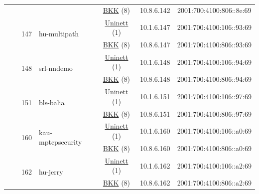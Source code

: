 \begin{small}
\begin{center}
\begin{longtable}{|c|c|c|c|c|c|c|c|}
  &  &  &  & \multicolumn{2}{|c|}{\tiny{\href{http://bkk.no}{BKK} (8)}} & \tiny{10.8.6.142} & \tiny{2001:700:4100:806::8e:69} \\* \cline{3-3}\cline{4-4}\cline{5-5}\cline{6-6}\cline{7-7}\cline{8-8}
  &  & \multirow{2}{*}{\tiny{147}} & \multicolumn{1}{|l|}{\multirow{2}{*}{\tiny{hu-multipath}}} & \multicolumn{2}{|c|}{\tiny{\href{https://www.uninett.no}{Uninett} (1)}} & \tiny{10.1.6.147} & \tiny{2001:700:4100:106::93:69} \\* \cline{5-5}\cline{6-6}\cline{7-7}\cline{8-8}
  &  &  &  & \multicolumn{2}{|c|}{\tiny{\href{http://bkk.no}{BKK} (8)}} & \tiny{10.8.6.147} & \tiny{2001:700:4100:806::93:69} \\* \cline{3-3}\cline{4-4}\cline{5-5}\cline{6-6}\cline{7-7}\cline{8-8}
  &  & \multirow{2}{*}{\tiny{148}} & \multicolumn{1}{|l|}{\multirow{2}{*}{\tiny{srl-nndemo}}} & \multicolumn{2}{|c|}{\tiny{\href{https://www.uninett.no}{Uninett} (1)}} & \tiny{10.1.6.148} & \tiny{2001:700:4100:106::94:69} \\* \cline{5-5}\cline{6-6}\cline{7-7}\cline{8-8}
  &  &  &  & \multicolumn{2}{|c|}{\tiny{\href{http://bkk.no}{BKK} (8)}} & \tiny{10.8.6.148} & \tiny{2001:700:4100:806::94:69} \\* \cline{3-3}\cline{4-4}\cline{5-5}\cline{6-6}\cline{7-7}\cline{8-8}
  &  & \multirow{2}{*}{\tiny{151}} & \multicolumn{1}{|l|}{\multirow{2}{*}{\tiny{bls-balia}}} & \multicolumn{2}{|c|}{\tiny{\href{https://www.uninett.no}{Uninett} (1)}} & \tiny{10.1.6.151} & \tiny{2001:700:4100:106::97:69} \\* \cline{5-5}\cline{6-6}\cline{7-7}\cline{8-8}
  &  &  &  & \multicolumn{2}{|c|}{\tiny{\href{http://bkk.no}{BKK} (8)}} & \tiny{10.8.6.151} & \tiny{2001:700:4100:806::97:69} \\* \cline{3-3}\cline{4-4}\cline{5-5}\cline{6-6}\cline{7-7}\cline{8-8}
  &  & \multirow{2}{*}{\tiny{160}} & \multicolumn{1}{|l|}{\multirow{2}{*}{\tiny{kau-mptcpsecurity}}} & \multicolumn{2}{|c|}{\tiny{\href{https://www.uninett.no}{Uninett} (1)}} & \tiny{10.1.6.160} & \tiny{2001:700:4100:106::a0:69} \\* \cline{5-5}\cline{6-6}\cline{7-7}\cline{8-8}
  &  &  &  & \multicolumn{2}{|c|}{\tiny{\href{http://bkk.no}{BKK} (8)}} & \tiny{10.8.6.160} & \tiny{2001:700:4100:806::a0:69} \\* \cline{3-3}\cline{4-4}\cline{5-5}\cline{6-6}\cline{7-7}\cline{8-8}
  &  & \multirow{2}{*}{\tiny{162}} & \multicolumn{1}{|l|}{\multirow{2}{*}{\tiny{hu-jerry}}} & \multicolumn{2}{|c|}{\tiny{\href{https://www.uninett.no}{Uninett} (1)}} & \tiny{10.1.6.162} & \tiny{2001:700:4100:106::a2:69} \\* \cline{5-5}\cline{6-6}\cline{7-7}\cline{8-8}
  &  &  &  & \multicolumn{2}{|c|}{\tiny{\href{http://bkk.no}{BKK} (8)}} & \tiny{10.8.6.162} & \tiny{2001:700:4100:806::a2:69} \\ \hline
\end{longtable}
\end{center}
\end{small}



